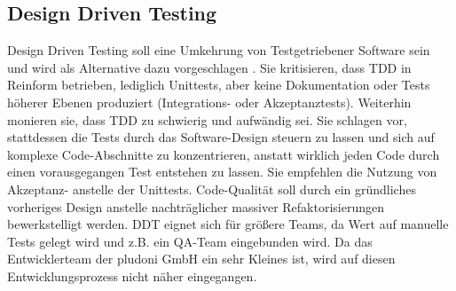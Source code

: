 \subsection{Design Driven Testing}
Design Driven Testing soll eine Umkehrung von Testgetriebener Software sein und wird \citeauthor*{stephens_design_2010} als Alternative dazu vorgeschlagen \citep{stephens_design_2010}. Sie kritisieren, dass TDD in Reinform betrieben, lediglich Unittests, aber keine Dokumentation oder Tests höherer Ebenen produziert (Integrations- oder Akzeptanztests). Weiterhin monieren sie, dass TDD zu schwierig und aufwändig sei. Sie schlagen vor, stattdessen die Tests durch das Software-Design steuern zu lassen und sich auf komplexe Code-Abschnitte zu konzentrieren, anstatt wirklich jeden Code durch einen vorausgegangen Test entstehen zu lassen. Sie empfehlen die Nutzung von Akzeptanz- anstelle der Unittests. Code-Qualität soll durch ein gründliches vorheriges Design anstelle nachträglicher massiver Refaktorisierungen bewerkstelligt werden.
DDT eignet sich für größere Teams, da Wert auf manuelle Tests gelegt wird und z.B. ein QA-Team eingebunden wird. Da das Entwicklerteam der pludoni GmbH ein sehr Kleines ist, wird auf diesen Entwicklungsprozess nicht näher eingegangen.
